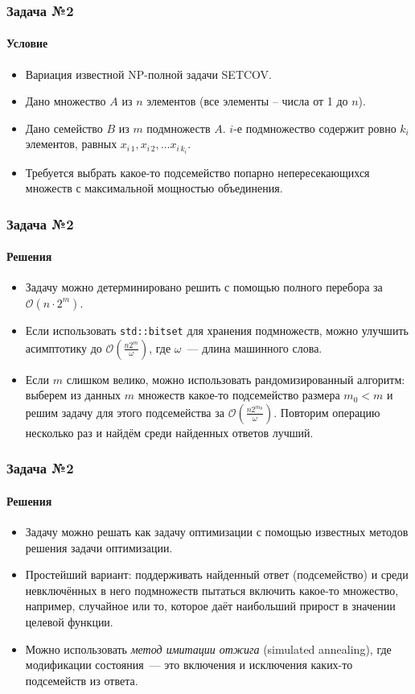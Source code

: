 \documentclass{beamer}
\begin{document}
\begin{frame}
\frametitle{Задача №2}
\framesubtitle{Условие}
\begin{itemize}
	\item Вариация известной NP-полной задачи SETCOV.
	\item Дано множество $A$ из $n$ элементов (все элементы -- числа от 1 до $n$). 
	\item Дано семейство $B$ из  $m$ подмножеств $A$. $i$-е подмножество содержит ровно $k_i$ элементов, равных $x_{i\, 1}, x_{i\, 2}, \ldots x_{i\, k_i}$. 
	\item Требуется выбрать какое-то подсемейство попарно непересекающихся множеств с максимальной мощностью объединения.
\end{itemize}
\end{frame}








\begin{frame}
\frametitle{Задача №2}
\framesubtitle{Решения}
\begin{itemize}
	\item Задачу можно детерминировано решить с помощью полного перебора за $\mathcal O \left(n\cdot2^m\right)$. 

	\item Если использовать \texttt{std::bitset} для хранения подмножеств, можно улучшить асимптотику до $\mathcal O \left(\frac{n2^m}{\omega}\right)$, где $\omega$~--- длина машинного слова.

	\item Если $m$ слишком велико, можно использовать рандомизированный алгоритм: выберем из данных $m$ множеств какое-то подсемейство размера $m_0 < m$ и решим задачу для этого 
	подсемейства за $\mathcal O \left(\frac{n2^{m_0}}{\omega}\right)$. Повторим операцию несколько раз и найдём среди найденных ответов лучший.
\end{itemize}
\end{frame}








\begin{frame}
\frametitle{Задача №2}
\framesubtitle{Решения}
\begin{itemize}
	\item Задачу можно решать как задачу оптимизации с помощью известных методов решения задачи оптимизации.
	\item Простейший вариант: поддерживать найденный ответ (подсемейство) и среди невключённых в него подмножеств пытаться включить какое-то множество, например, случайное или то, которое даёт наибольший прирост в значении целевой функции.
	\item Можно использовать \emph{метод имитации отжига} (simulated annealing), где модификации состояния~--- это включения и исключения каких-то подсемейств из ответа.
\end{itemize}
\end{frame}
\end{document}
